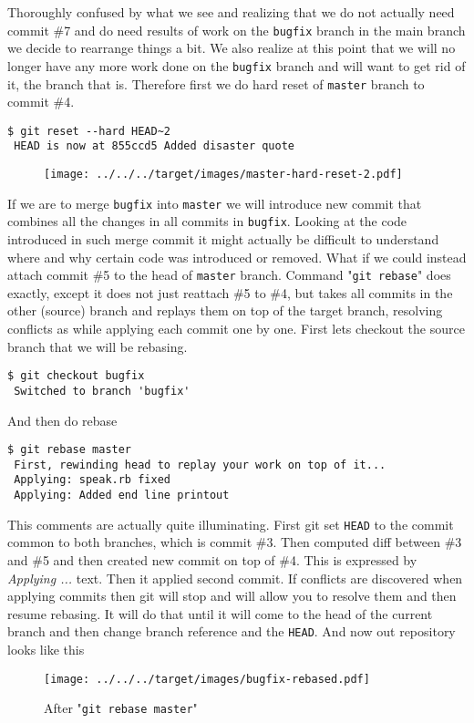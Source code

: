 \documentclass{article}
\theoremstyle{definition}
\begin{document}
        \noindent Thoroughly confused by what we see and realizing that we do not actually need commit \#7 and do need
        results of work on the \texttt{bugfix} branch in the main branch we decide to rearrange things a bit. We also
        realize at this point that we will no longer have any more work done on the \texttt{bugfix} branch and will
        want to get rid of it, the branch that is.  Therefore first we do hard reset of \texttt{master} branch to
        commit \#4.
        \begin{Verbatim}[frame=single]
 $ git reset --hard HEAD~2
 HEAD is now at 855ccd5 Added disaster quote
        \end{Verbatim}

        \begin{figure}[h]
        \centering\texttt{[image: ../../../target/images/master-hard-reset-2.pdf]}
        \caption{\label{fig:master-hard-reset-2}}
        \end{figure}

        \noindent If we are to merge \texttt{bugfix} into \texttt{master} we will introduce new commit that combines all
        the changes in all commits in \texttt{bugfix}. Looking at the code introduced in such merge commit it might
        actually be difficult to understand where and why certain code was introduced or removed. What if we could
        instead attach commit \#5 to the head of \texttt{master} branch. Command "\texttt{git rebase}" does exactly,
        except it does not just reattach \#5 to \#4, but takes all commits in the other (source) branch and replays them
        on top of the target branch, resolving conflicts as while applying each commit one by one. First lets checkout
        the source branch that we will be rebasing.
        \begin{Verbatim}[frame=single]
 $ git checkout bugfix
 Switched to branch 'bugfix'
    \end{Verbatim}
    And then do rebase
        \begin{Verbatim}[frame=single]
 $ git rebase master
 First, rewinding head to replay your work on top of it...
 Applying: speak.rb fixed
 Applying: Added end line printout
        \end{Verbatim}
        This comments are actually quite illuminating. First git set \texttt{HEAD} to the commit common to both
        branches, which is commit \#3. Then computed diff between \#3 and \#5 and then created new commit on top
        of \#4. This is expressed by {\em Applying ...} text. Then it applied second commit. If conflicts are discovered
        when applying commits then git will stop and will allow you to resolve them and then resume rebasing. It will do
        that until it will come to the head of the current branch and then change branch reference and
        the \texttt{HEAD}. And now out repository looks like this
        \newpage
        \begin{figure}[h]
        \centering\texttt{[image: ../../../target/images/bugfix-rebased.pdf]}
        \caption{After "\texttt{git rebase master}"\label{fig:bugfix-rebased}}
        \end{figure}
\end{document}
